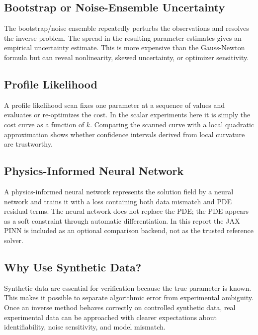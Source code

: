 \documentclass[11pt]{article}
\numberwithin{equation}{section}
\begin{document}
\subsection{Bootstrap or Noise-Ensemble Uncertainty}

The bootstrap/noise ensemble repeatedly perturbs the observations and resolves
the inverse problem.  The spread in the resulting parameter estimates gives an
empirical uncertainty estimate.  This is more expensive than the Gauss-Newton
formula but can reveal nonlinearity, skewed uncertainty, or optimizer
sensitivity.

\subsection{Profile Likelihood}

A profile likelihood scan fixes one parameter at a sequence of values and
evaluates or re-optimizes the cost.  In the scalar experiments here it is simply
the cost curve as a function of $k$.  Comparing the scanned curve with a local
quadratic approximation shows whether confidence intervals derived from local
curvature are trustworthy.

\subsection{Physics-Informed Neural Network}

A physics-informed neural network represents the solution field by a neural
network and trains it with a loss containing both data mismatch and PDE
residual terms.  The neural network does not replace the PDE; the PDE appears
as a soft constraint through automatic differentiation.  In this report the JAX
PINN is included as an optional comparison backend, not as the trusted reference
solver.

\subsection{Why Use Synthetic Data?}

Synthetic data are essential for verification because the true parameter is
known.  This makes it possible to separate algorithmic error from experimental
ambiguity.  Once an inverse method behaves correctly on controlled synthetic
data, real experimental data can be approached with clearer expectations about
identifiability, noise sensitivity, and model mismatch.
\end{document}
